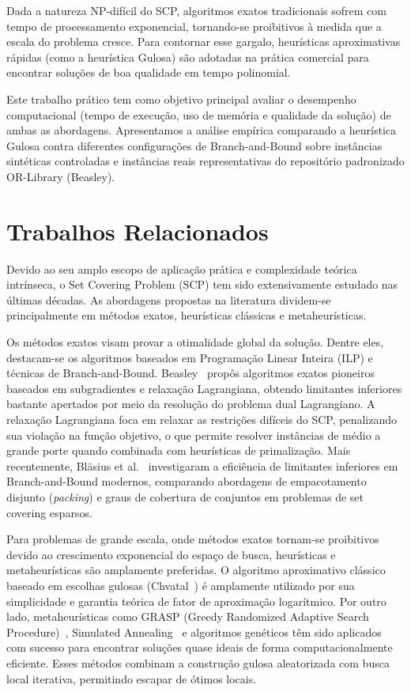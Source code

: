 \documentclass[conference]{IEEEtran}
\begin{document}
Dada a natureza NP-difícil do SCP, algoritmos exatos tradicionais sofrem com tempo de processamento exponencial, tornando-se proibitivos à medida que a escala do problema cresce. Para contornar esse gargalo, heurísticas aproximativas rápidas (como a heurística Gulosa) são adotadas na prática comercial para encontrar soluções de boa qualidade em tempo polinomial.

Este trabalho prático tem como objetivo principal avaliar o desempenho computacional (tempo de execução, uso de memória e qualidade da solução) de ambas as abordagens. Apresentamos a análise empírica comparando a heurística Gulosa contra diferentes configurações de Branch-and-Bound sobre instâncias sintéticas controladas e instâncias reais representativas do repositório padronizado OR-Library (Beasley).

\section{Trabalhos Relacionados}
Devido ao seu amplo escopo de aplicação prática e complexidade teórica intrínseca, o Set Covering Problem (SCP) tem sido extensivamente estudado nas últimas décadas. As abordagens propostas na literatura dividem-se principalmente em métodos exatos, heurísticas clássicas e metaheurísticas.

Os métodos exatos visam provar a otimalidade global da solução. Dentre eles, destacam-se os algoritmos baseados em Programação Linear Inteira (ILP) e técnicas de Branch-and-Bound. Beasley~\cite{b1} propôs algoritmos exatos pioneiros baseados em subgradientes e relaxação Lagrangiana, obtendo limitantes inferiores bastante apertados por meio da resolução do problema dual Lagrangiano. A relaxação Lagrangiana foca em relaxar as restrições difíceis do SCP, penalizando sua violação na função objetivo, o que permite resolver instâncias de médio a grande porte quando combinada com heurísticas de primalização. Mais recentemente, Bläsius et al.~\cite{b2} investigaram a eficiência de limitantes inferiores em Branch-and-Bound modernos, comparando abordagens de empacotamento disjunto (\textit{packing}) e graus de cobertura de conjuntos em problemas de set covering esparsos.

Para problemas de grande escala, onde métodos exatos tornam-se proibitivos devido ao crescimento exponencial do espaço de busca, heurísticas e metaheurísticas são amplamente preferidas. O algoritmo aproximativo clássico baseado em escolhas gulosas (Chvatal~\cite{b3}) é amplamente utilizado por sua simplicidade e garantia teórica de fator de aproximação logarítmico. Por outro lado, metaheurísticas como GRASP (Greedy Randomized Adaptive Search Procedure)~\cite{b4}, Simulated Annealing~\cite{b5} e algoritmos genéticos têm sido aplicados com sucesso para encontrar soluções quase ideais de forma computacionalmente eficiente. Esses métodos combinam a construção gulosa aleatorizada com busca local iterativa, permitindo escapar de ótimos locais.
\end{document}

